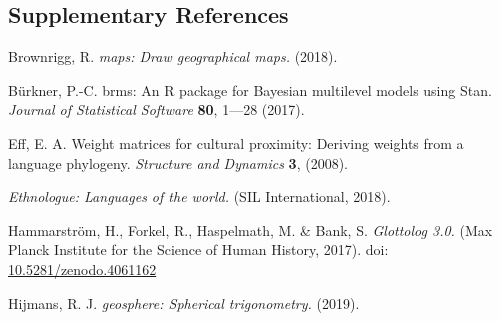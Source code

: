 \documentclass[
  man,floatsintext]{apa6}
\begin{document}
\newpage

\hypertarget{supplementary-references}{%
\subsection{Supplementary References}\label{supplementary-references}}

Brownrigg, R. \emph{maps: Draw geographical maps.} (2018).

Bürkner, P.-C. brms: An R package for Bayesian multilevel models using Stan. \emph{Journal of Statistical Software} \textbf{80}, 1---28 (2017).

Eff, E. A. Weight matrices for cultural proximity: Deriving weights from a language phylogeny. \emph{Structure and Dynamics} \textbf{3}, (2008).

\emph{Ethnologue: Languages of the world.} (SIL International, 2018).

Hammarström, H., Forkel, R., Haspelmath, M. \& Bank, S. \emph{Glottolog 3.0.} (Max Planck Institute for the Science of Human History, 2017). doi: \href{https://doi.org/10.5281/zenodo.4061162}{10.5281/zenodo.4061162}

Hijmans, R. J. \emph{geosphere: Spherical trigonometry.} (2019).
\end{document}
